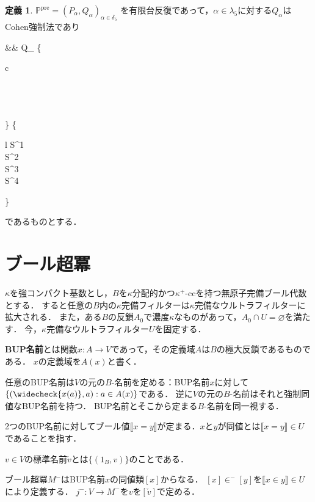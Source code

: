 \documentclass[uplatex,dvipdfmx]{jsarticle}
\newcommand{\Pa}{\mathbb{P}^\mathrm{pre}}
\newcommand{\truth}[1]{\llbracket #1 \rrbracket}
\renewcommand\emptyset{\varnothing}
\theoremstyle{definition}
\newtheorem{defi}[thm]{定義}
\begin{document}
	\begin{defi}\label{def:Pa}
		$\Pa=(P_\alpha,Q_\alpha)_{\alpha\in\delta_5}$ 
		を有限台反復であって，$\alpha\in \lambda_5$に対する$Q_\alpha$はCohen強制法であり
		\begin{flalign*}
			&&
			Q_\alpha\text{ は$w_\alpha$-部分的 }
			\left\{
			\begin{array}{c}
				\\
				\\
				\\
				\\
			\end{array}\right\}
			 \hspace{0.5cm} \text{($\alpha$が}
			\left\{
			\begin{array}{l}
				S^1\\
				S^2\\
				S^3\\
				S^4\\
			\end{array}
			\right\} 
			\\
		\end{flalign*}
		であるものとする．
	\end{defi}
	
	\section{ブール超冪}
	
	$\kappa$を強コンパクト基数とし，$B$を$\kappa$分配的かつ$\kappa^+$-ccを持つ無原子完備ブール代数とする．
	すると任意の$B$内の$\kappa$完備フィルターは$\kappa$完備なウルトラフィルターに拡大される．
	また，ある$B$の反鎖$A_0$で濃度$\kappa$なものがあって，$A_0 \cap U = \emptyset$を満たす．
	今，$\kappa$完備なウルトラフィルター$U$を固定する．
	
	\textbf{BUP名前}とは関数$x \colon A \to V$であって，その定義域$A$は$B$の極大反鎖であるものである．
	$x$の定義域を$A(x)$と書く．
	
	任意のBUP名前は$V$の元の$B$-名前を定める：BUP名前$x$に対して$\{ (\widecheck{x(a)}, a) : a \in A(x) \}$である．
	逆に$V$の元の$B$-名前はそれと強制同値なBUP名前を持つ．
	BUP名前とそこから定まる$B$-名前を同一視する．
	
	2つのBUP名前に対してブール値$\truth{x=y}$が定まる．$x$と$y$が同値とは$\truth{x=y} \in U$であることを指す．
	
	$v \in V$の標準名前$\check{v}$とは$\{ (1_B, v) \}$のことである．
	
	ブール超冪$M^-$はBUP名前$x$の同値類$[x]$からなる．
	$[x] \in^- [y]$を$\truth{x \in y} \in U$により定義する．
	$j^- \colon V \to M^-$を$v$を$[\check{v}]$で定める．
	
	
	
	
	\nocite{*}
	\printbibliography[title={参考文献}]
\end{document}
